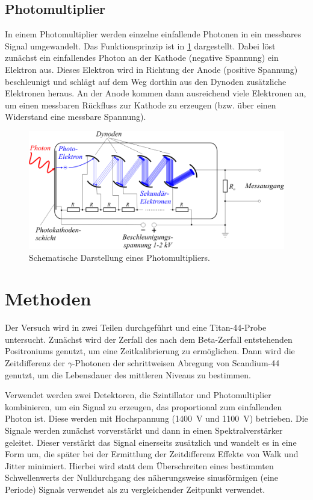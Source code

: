 \documentclass[
	a4paper,
	12pt,
	pagesize,
	ngerman
]{scrartcl}
\begin{document}
	\subsection{Photomultiplier}

	In einem Photomultiplier werden einzelne einfallende Photonen in ein messbares Signal umgewandelt.
	Das Funktionsprinzip ist in \cref{fig_Photomultiplier} dargestellt.
	Dabei löst zunächst ein einfallendes Photon an der Kathode (negative Spannung) ein Elektron aus.
	Dieses Elektron wird in Richtung der Anode (positive Spannung) beschleunigt und schlägt auf dem Weg dorthin aus den Dynoden zusätzliche Elektronen heraus.
	An der Anode kommen dann ausreichend viele Elektronen an, um einen messbaren Rückfluss zur Kathode zu erzeugen (bzw. über einen Widerstand eine messbare Spannung).

	\begin{figure}[H]
			\includegraphics[width=0.6\linewidth]{img/Photomultiplier}
			\caption{
			Schematische Darstellung eines Photomultipliers.
			\cite{Photomultiplier}
			}
			\label{fig_Photomultiplier}
	\end{figure}

	\section{Methoden}
	Der Versuch wird in zwei Teilen durchgeführt und eine Titan-44-Probe untersucht.
	Zunächst wird der Zerfall des nach dem Beta-Zerfall entstehenden Positroniums genutzt, um eine Zeitkalibrierung zu ermöglichen.
	Dann wird die Zeitdifferenz der $\gamma$-Photonen der schrittweisen Abregung von Scandium-44 genutzt, um die Lebensdauer des mittleren Niveaus zu bestimmen.


	Verwendet werden zwei Detektoren, die Szintillator und Photomultiplier kombinieren, um ein Signal zu erzeugen, das proportional zum einfallenden Photon ist.
	Diese werden mit Hochspannung (\SI{1400}{V} und \SI{1100}{V}) betrieben.
	Die Signale werden zunächst vorverstärkt und dann in einen Spektralverstärker geleitet.
	Dieser verstärkt das Signal einerseits zusätzlich und wandelt es in eine Form um, die später bei der Ermittlung der Zeitdifferenz Effekte von Walk und Jitter minimiert.
	Hierbei wird statt dem Überschreiten eines bestimmten Schwellenwerts der Nulldurchgang des näherungsweise sinusförmigen (eine Periode) Signals verwendet als zu vergleichender Zeitpunkt verwendet.
\end{document}
